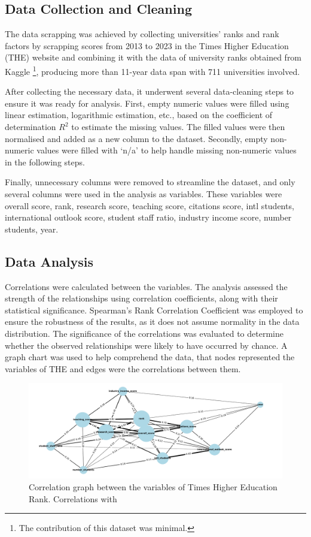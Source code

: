 \documentclass[conference]{IEEEtran}
\begin{document}
\subsection{Data Collection and Cleaning}

The data scrapping was achieved by collecting universities' ranks and rank factors by scrapping scores from 2013 to 2023 in the Times Higher Education (THE) website \cite{the2024} and combining it with the data of university ranks obtained from Kaggle \cite{ONeil_2020}\footnote{The contribution of this dataset was minimal.}, producing more than 11-year data span with 711 universities involved. 

After collecting the necessary data, it underwent several data-cleaning steps to ensure it was ready for analysis. First, empty numeric values were filled using linear estimation, logarithmic estimation, etc., based on the coefficient of determination $R^{2}$ to estimate the missing values. The filled values were then normalised and added as a new column to the dataset. Secondly, empty non-numeric values were filled with `n/a' to help handle missing non-numeric values in the following steps.

Finally, unnecessary columns were removed to streamline the dataset, and only several columns were used in the analysis as variables. These variables were overall score, rank, research score, teaching score, citations score, intl students, international outlook score, student staff ratio, industry income score, number students, year. 

\subsection{Data Analysis}

Correlations were calculated between the variables. The analysis assessed the strength of the relationships using correlation coefficients, along with their statistical significance. Spearman's Rank Correlation Coefficient \cite{spearman1904general} was employed to ensure the robustness of the results, as it does not assume normality in the data distribution. The significance of the correlations was evaluated to determine whether the observed relationships were likely to have occurred by chance. A graph chart was used to help comprehend the data, that nodes represented the variables of THE and edges were the correlations between them. 

\begin{figure}[t]
	\centering
	\includegraphics[width=\linewidth]{figures/correlation_graph.pdf}
	\caption{Correlation graph between the variables of Times Higher Education Rank. Correlations with }
	\label{fig:graf_citation}
\end{figure}
\end{document}
